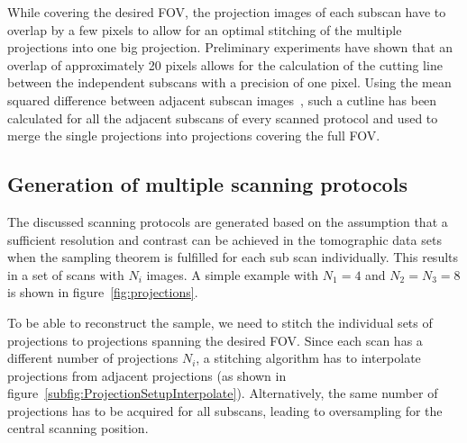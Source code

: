 While covering the desired FOV, the projection images of each subscan have to overlap by a few pixels to allow for an optimal stitching of the multiple projections into one big projection. Preliminary experiments have shown that an overlap of approximately 20 pixels allows for the calculation of the cutting line between the independent subscans with a precision of one pixel. Using the mean squared difference between adjacent subscan images~\cite{Hintermueller2009}, such a cutline has been calculated for all the adjacent subscans of every scanned protocol and used to merge the single projections into projections covering the full FOV.

\subsection{Generation of multiple scanning protocols}%
The discussed scanning protocols are generated based on the assumption that a sufficient resolution and contrast can be achieved in the tomographic data sets when the sampling theorem is fulfilled for each sub scan individually. This results in a set of scans with $N_{i}$ images. A simple example with $N_{1}=4$ and $N_{2}=N_{3}=8$ is shown in figure~\ref{fig:projections}.

To be able to reconstruct the sample, we need to stitch the individual sets of projections to projections spanning the desired FOV. Since each scan has a different number of projections $N_{i}$, a stitching algorithm has to interpolate projections from adjacent projections (as shown in figure~\ref{subfig:ProjectionSetupInterpolate}). Alternatively, the same number of projections has to be acquired for all subscans, leading to oversampling for the central scanning position.

